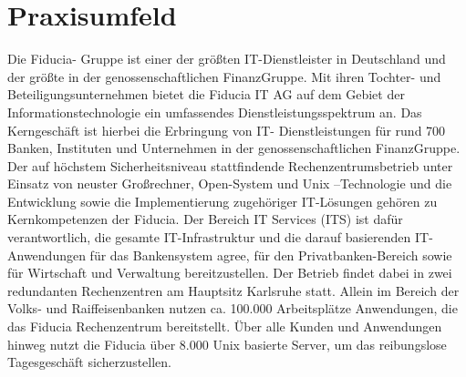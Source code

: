 \section{Praxisumfeld}
Die Fiducia- Gruppe ist einer der größten IT-Dienstleister in Deutschland und der größte in der genossenschaftlichen FinanzGruppe. 
Mit ihren Tochter- und Beteiligungsunternehmen bietet die Fiducia IT AG auf dem Gebiet der Informationstechnologie ein umfassendes Dienstleistungsspektrum an.
Das Kerngeschäft ist hierbei die Erbringung von IT- Dienstleistungen für rund 700 Banken, Instituten und Unternehmen in der genossenschaftlichen FinanzGruppe.
Der auf höchstem Sicherheitsniveau stattfindende Rechenzentrumsbetrieb unter Einsatz von neuster Großrechner, Open-System und Unix –Technologie und die Entwicklung
sowie die Implementierung zugehöriger IT-Lösungen gehören zu Kernkompetenzen der Fiducia. \cite{website:fiducia}
Der Bereich IT Services (ITS) ist dafür verantwortlich, die gesamte IT-Infrastruktur und die darauf basierenden IT-Anwendungen für das Bankensystem agree, 
für den Privatbanken-Bereich sowie für Wirtschaft und Verwaltung bereitzustellen. Der Betrieb findet dabei in zwei redundanten Rechenzentren am Hauptsitz Karlsruhe statt. Allein im Bereich der Volks- und Raiffeisenbanken nutzen ca. 100.000 Arbeitsplätze Anwendungen, die das Fiducia Rechenzentrum bereitstellt. Über alle Kunden und Anwendungen hinweg nutzt die Fiducia über 8.000 Unix basierte Server, um das reibungslose Tagesgeschäft sicherzustellen.
